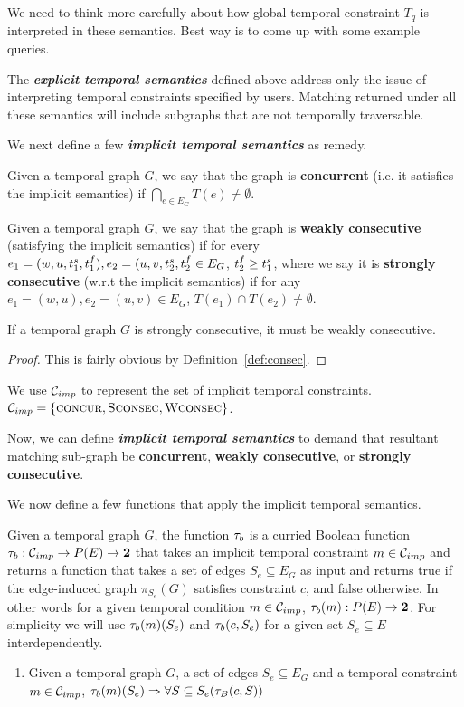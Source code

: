  We need to think more carefully about how global temporal
constraint $T_q$ is interpreted in these semantics. Best way is to come up with
some example queries.

\SmallSpace

The {\bf {\em explicit temporal semantics}} defined above address only the issue
of interpreting temporal constraints specified by users. Matching returned under
all these semantics will include subgraphs that are not temporally traversable.

We next define a few {\bf {\em implicit temporal semantics}} as remedy. 

\begin{defn}
  \label{def:concur}
  Given a temporal graph $G$, we say that the graph is {\bf concurrent} (i.e. it
  satisfies the \concurrent{} implicit semantics) if $\displaystyle\bigcap_{e
    \in E_G} T(e) \neq \emptyset$.
\end{defn}

\begin{defn}
  \label{def:consec}  
  Given a temporal graph $G$, we say that the graph is \textbf{weakly
    consecutive} (satisfying the \weakConsec{} implicit semantics) if for every
  $e_1 = (w,u, t^s_1 , t^f_1), e_2 = (u,v, t^s_2, t^f_2 \in E_G$, $t^f_2 \geq
  t^s_1$, where we say it is {\bf strongly consecutive} (w.r.t the
  \strongConsec{} implicit semantics) if for any $e_1 = (w,u), e_2=(u,v) \in
  E_G$, $T(e_1) \cap T(e_2) \neq \emptyset$.
\end{defn}

\begin{lemma}
If a temporal graph $G$ is strongly consecutive, it must be weakly consecutive.
\end{lemma}
\begin{proof}
  This is fairly obvious by Definition~\ref{def:consec}.
\end{proof}

We use $\mathcal{C}_{imp}$ to represent the set of implicit temporal constraints. $\mathcal{C}_{imp} =
\{\textsc{concur}, \textsc{Sconsec}, \textsc{Wconsec}\}$.

Now, we can define {\bf {\em implicit temporal semantics}} to demand that
resultant matching sub-graph be \textbf{concurrent}, \textbf{weakly
  consecutive}, or \textbf{strongly consecutive}.

We now define a few functions that apply the implicit temporal semantics. 

\begin{defn}
  Given a temporal graph $G$, the function $\tau_b$ is a curried Boolean
  function $\tau_b : \mathcal{C}_{imp} \to P(E) \to \textbf{2} $ that takes an implicit
  temporal constraint $m \in \mathcal{C}_{imp}$ and returns a function that takes a
  set of edges $S_e \subseteq E_G$ as input and returns true if the edge-induced
  graph $\pi_{S_e}(G)$ satisfies constraint $c$, and false otherwise. In other
  words for a given temporal condition $m \in \mathcal{C}_{imp}$, $\tau_b(m)
  : P(E) \to \textbf{2}$. For simplicity we will use $\tau_b(m)(S_e)$
  and $\tau_b(c,S_e)$ for a given set $S_e \subseteq E$ interdependently.
\end{defn}

\begin{enumerate}
  \item Given a temporal graph $G$, a set of edges $S_e \subseteq E_G$ and a
    temporal constraint $m \in \mathcal{C}_{imp}$, $\tau_b(m)(S_e)
    \Rightarrow \forall S \subseteq S_e (\tau_B(c, S))$
\end{enumerate}
